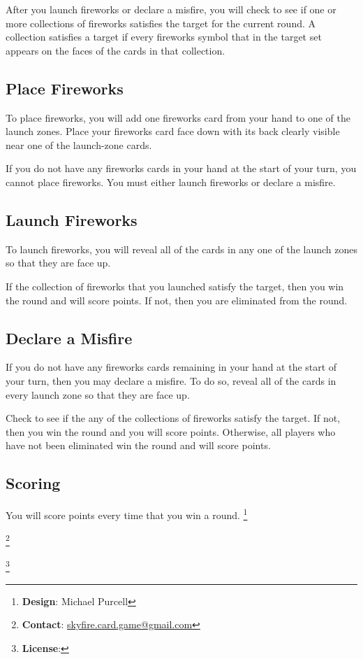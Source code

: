 \documentclass[a6paper, 12pt, parskip=half, DIV=14]{scrartcl}
\newcommand\blfootnote[1]{%
  \begingroup
  \renewcommand\thefootnote{}\footnote{#1}%
  \addtocounter{footnote}{-1}%
  \endgroup
}
\renewcommand{\thefootnote}{\fnsymbol{footnote}}
\begin{document}
After you launch fireworks or declare a misfire, you will check to see if one or more collections of fireworks satisfies the target for the current round. A collection satisfies a target if every fireworks symbol that in the target set appears on the faces of the cards in that collection.

\subsection*{Place Fireworks}
To place fireworks, you will add one fireworks card from your hand to one of the launch zones. Place your fireworks card face down with its back clearly visible near one of the launch-zone cards.  

If you do not have any fireworks cards in your hand at the start of your turn, you cannot place fireworks. You must either launch fireworks or declare a misfire.
\newpage
\enlargethispage{1.75\baselineskip}
\subsection*{Launch Fireworks}
To launch fireworks, you will reveal all of the cards in any one of the launch zones so that they are face up.

If the collection of fireworks that you launched satisfy the target, then you win the round and will score points. If not, then you are eliminated from the round.

\subsection*{Declare a Misfire}
If you do not have any fireworks cards remaining in your hand at the start of your turn, then you may declare a misfire. To do so, reveal all of the cards in every launch zone so that they are face up.

Check to see if the any of the collections of fireworks satisfy the target. If not, then you win the round and you will score points. Otherwise, all players who have not been eliminated win the round and will score points.

\newpage
\enlargethispage{1.75\baselineskip}
\subsection*{Scoring}
You will score points every time that you win a round.
\blfootnote{\textbf{Design}: Michael Purcell}
\blfootnote{\textbf{Contact}: \href{mailto:skyfire.card.game@gmail.com}{skyfire.card.game@gmail.com}}
\blfootnote{\textbf{License}: \raggedright\doclicenseText}
\end{document}
